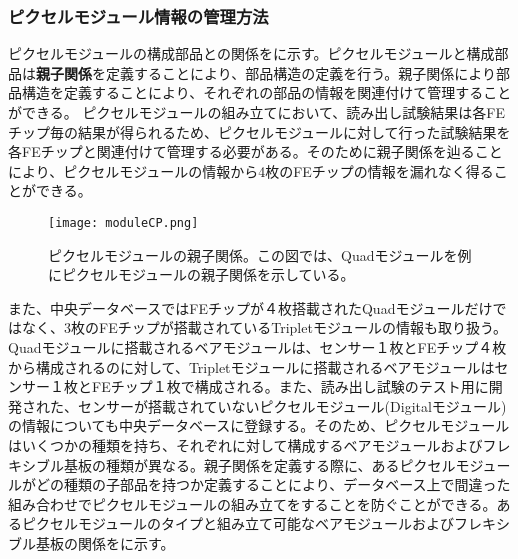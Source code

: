 \subsubsection{ピクセルモジュール情報の管理方法}
\label{sec:module-parentchild}

ピクセルモジュールの構成部品との関係をに示す。ピクセルモジュールと構成部品は\textbf{親子関係}を定義することにより、部品構造の定義を行う。親子関係により部品構造を定義することにより、それぞれの部品の情報を関連付けて管理することができる。
ピクセルモジュールの組み立てにおいて、読み出し試験結果は各FEチップ毎の結果が得られるため、ピクセルモジュールに対して行った試験結果を各FEチップと関連付けて管理する必要がある。そのために親子関係を辿ることにより、ピクセルモジュールの情報から4枚のFEチップの情報を漏れなく得ることができる。
\begin{figure}[tbp]
  \centering
  \texttt{[image: moduleCP.png]}
  \caption[ピクセルモジュールの親子関係]{ピクセルモジュールの親子関係。この図では、Quadモジュールを例にピクセルモジュールの親子関係を示している。}
  \label{fig:moduleCP}
\end{figure}

また、中央データベースではFEチップが４枚搭載されたQuadモジュールだけではなく、3枚のFEチップが搭載されているTripletモジュールの情報も取り扱う。Quadモジュールに搭載されるベアモジュールは、センサー１枚とFEチップ４枚から構成されるのに対して、Tripletモジュールに搭載されるベアモジュールはセンサー１枚とFEチップ１枚で構成される。また、読み出し試験のテスト用に開発された、センサーが搭載されていないピクセルモジュール(Digitalモジュール)の情報についても中央データベースに登録する。そのため、ピクセルモジュールはいくつかの種類を持ち、それぞれに対して構成するベアモジュールおよびフレキシブル基板の種類が異なる。親子関係を定義する際に、あるピクセルモジュールがどの種類の子部品を持つか定義することにより、データベース上で間違った組み合わせでピクセルモジュールの組み立てをすることを防ぐことができる。あるピクセルモジュールのタイプと組み立て可能なベアモジュールおよびフレキシブル基板の関係をに示す。


